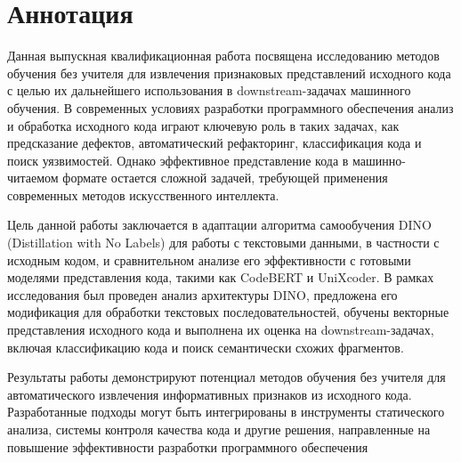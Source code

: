 \documentclass[../document.tex]{subfiles}
\begin{document}
    \section{Аннотация}
    \par Данная выпускная квалификационная работа посвящена исследованию методов обучения без учителя для извлечения признаковых представлений исходного кода с целью их дальнейшего использования в downstream-задачах машинного обучения. В современных условиях разработки программного обеспечения анализ и обработка исходного кода играют ключевую роль в таких задачах, как предсказание дефектов, автоматический рефакторинг, классификация кода и поиск уязвимостей. Однако эффективное представление кода в машинно-читаемом формате остается сложной задачей, требующей применения современных методов искусственного интеллекта.
    \par Цель данной работы заключается в адаптации алгоритма самообучения DINO (Distillation with No Labels) для работы с текстовыми данными, в частности с исходным кодом, и сравнительном анализе его эффективности с готовыми моделями представления кода, такими как CodeBERT и UniXcoder. В рамках исследования был проведен анализ архитектуры DINO, предложена его модификация для обработки текстовых последовательностей, обучены векторные представления исходного кода и выполнена их оценка на downstream-задачах, включая классификацию кода и поиск семантически схожих фрагментов.
    \par Результаты работы демонстрируют потенциал методов обучения без учителя для автоматического извлечения информативных признаков из исходного кода. Разработанные подходы могут быть интегрированы в инструменты статического анализа, системы контроля качества кода и другие решения, направленные на повышение эффективности разработки программного обеспечения
\end{document}
